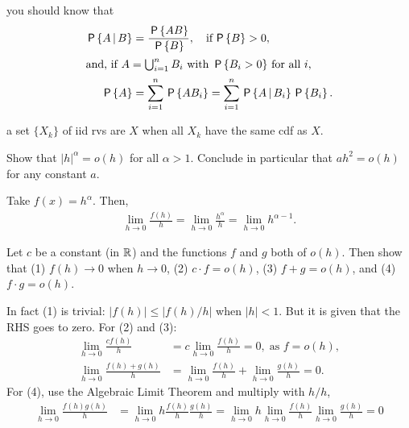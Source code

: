 \documentclass[queueing-book]{subfiles}
\begin{document}
 you should know that
\begin{subequations}\label{eq:70}
\begin{align}
\,\mathsf{P}\left\{A\,\middle|\, B\right\} & = \frac{\,\mathsf{P}\left\{AB\right\}}{\,\mathsf{P}\left\{B\right\}}, \quad\text{if}\, \,\mathsf{P}\left\{B\right\}>0, \\
\intertext{and, if $A=\bigcup_{i=1}^n B_i$ with $\,\mathsf{P}\left\{B_i>0\right\}$ for all $i$,}
 \,\mathsf{P}\left\{A\right\} &= \sum_{i=1}^n \,\mathsf{P}\left\{A B_i\right\} = \sum_{i=1}^n \,\mathsf{P}\left\{A\,\middle|\, B_i\right\} \,\mathsf{P}\left\{B_i\right\}.
\end{align}
\end{subequations}

 a set $\{X_k\}$ of iid rvs are  $X$ when all $X_k$ have the same cdf as $X$.

\begin{exercise}\label{ex:12}
Show that $|h|^{\alpha} = o(h)$ for all $\alpha > 1$. Conclude in particular that $a h^{2} = o(h)$ for any constant $a$.
\begin{solution}
Take $f(x) = h^{\alpha}$. Then,
\begin{align*}
\lim_{h\to 0} \frac{f(h)}{h} =
\lim_{h\to 0} \frac{h^{\alpha}}{h} =
\lim_{h\to 0} h^{\alpha-1}.
\end{align*}
\end{solution}
\end{exercise}




\begin{exercise}\label{ex:l-104}
 Let $c$ be a constant (in $\mathbb{R}$) and the functions $f$ and $g$ both of $o(h)$. Then show that (1) $f(h) \to 0$ when $h\to 0$, (2) $c\cdot f = o(h)$, (3) $f+g=o(h)$, and (4) $f\cdot g=o(h)$.
\begin{solution}
 In fact (1) is trivial: $|f(h)| \leq |f(h)/h|$ when $|h| < 1$.
 But it is given that the RHS goes to zero.
 For (2) and (3):
\begin{align*}
\lim_{h\to 0} \frac{c f(h)}{h} &= c \lim_{h\to 0} \frac{f(h)}{h} = 0, \; \text{as } f = o(h), \\
\lim_{h\to 0} \frac{f(h) + g(h)} h &= \lim_{h\to 0} \frac{f(h)} h + \lim_{h\to 0} \frac{g(h)} h = 0.
\end{align*}
For (4), use the Algebraic Limit Theorem and multiply with $h/h$,
\begin{align*}
\lim_{h\to 0} \frac{f(h)g(h)}{h} &= \lim_{h\to 0} h \frac{f(h)}{h} \frac{g(h)}{h}
= \lim_{h\to 0} h \lim_{h\to 0} \frac{f(h)}{h} \lim_{h\to 0} \frac{g(h)}{h} = 0
\end{align*}
\end{solution}
\end{exercise}
\end{document}
